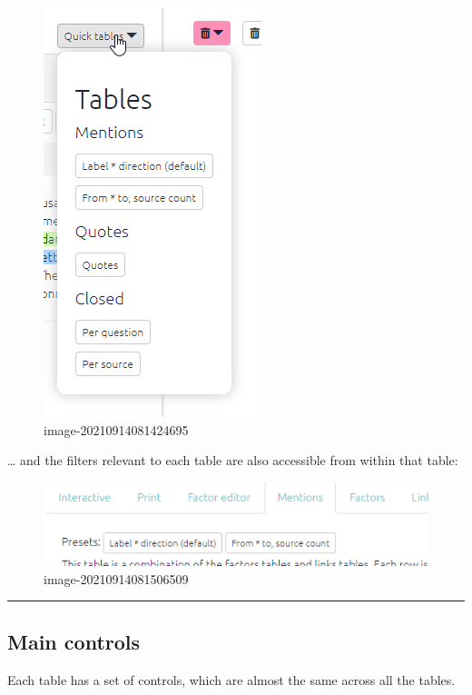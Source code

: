 \documentclass[
]{book}
\begin{document}
\begin{figure}
\centering
\includegraphics{_assets/image-20210914081424695.png}
\caption{image-20210914081424695}
\end{figure}

\ldots{} and the filters relevant to each table are also accessible from within that table:

\begin{figure}
\centering
\includegraphics{_assets/image-20210914081506509.png}
\caption{image-20210914081506509}
\end{figure}

\begin{center}\rule{0.5\linewidth}{0.5pt}\end{center}

\hypertarget{main-controls}{%
\subsection{Main controls}\label{main-controls}}

Each table has a set of controls, which are almost the same across all the tables.
\end{document}
